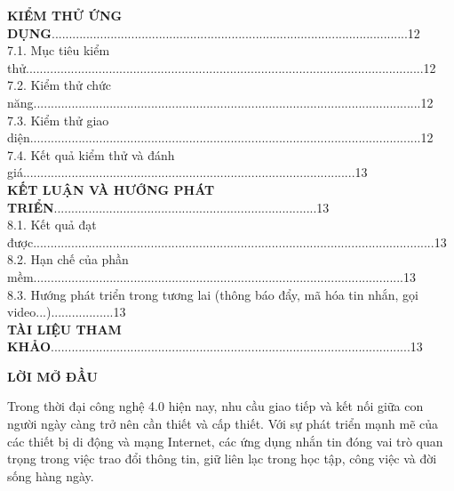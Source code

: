 \documentclass[12pt,a4paper]{article}
\begin{document}
\begin{flushleft}
		\vspace{0.5cm}
		\textbf{KIỂM THỬ ỨNG DỤNG}.......................................................................................................12\\
		7.1. Mục tiêu kiểm thử...................................................................................................................12\\
		7.2. Kiểm thử chức năng................................................................................................................12\\
		7.3. Kiểm thử giao diện.................................................................................................................12\\
		7.4. Kết quả kiểm thử và đánh giá................................................................................................13\\
		
		\vspace{0.5cm}
		\textbf{KẾT LUẬN VÀ HƯỚNG PHÁT TRIỂN}............................................................................13\\
		8.1. Kết quả đạt được....................................................................................................................13\\
		8.2. Hạn chế của phần mềm...........................................................................................................13\\
		8.3. Hướng phát triển trong tương lai (thông báo đẩy, mã hóa tin nhắn, gọi video...)..................13\\
		\vspace{0.5cm}
		\textbf{TÀI LIỆU THAM KHẢO}........................................................................................................13 \\
	
		
	\end{flushleft}
	
	\clearpage
	
	\noindent\textbf{\Large LỜI MỞ ĐẦU}
	
	\vspace{0.5cm}
	
	\noindent
	Trong thời đại công nghệ 4.0 hiện nay, nhu cầu giao tiếp và kết nối giữa con người ngày càng trở nên cần thiết và cấp thiết. Với sự phát triển mạnh mẽ của các thiết bị di động và mạng Internet, các ứng dụng nhắn tin đóng vai trò quan trọng trong việc trao đổi thông tin, giữ liên lạc trong học tập, công việc và đời sống hàng ngày.
	
\end{document}
